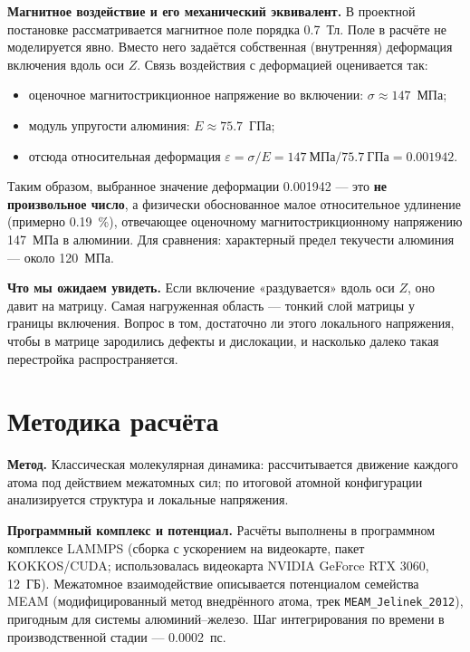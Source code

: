 \documentclass[12pt,a4paper]{extarticle}
\newcommand{\code}[1]{\texttt{#1}}
\begin{document}
\smallskip
\noindent\textbf{Магнитное воздействие и его механический эквивалент.} В проектной постановке рассматривается магнитное поле порядка 0.7~Тл. Поле в расчёте не моделируется явно. Вместо него задаётся собственная (внутренняя) деформация включения вдоль оси $Z$. Связь воздействия с деформацией оценивается так:
\begin{itemize}[leftmargin=1.4em,itemsep=2pt,topsep=2pt]
\item оценочное магнитострикционное напряжение во включении: $\sigma \approx 147$~МПа;
\item модуль упругости алюминия: $E \approx 75.7$~ГПа;
\item отсюда относительная деформация $\varepsilon = \sigma / E = 147~\text{МПа} / 75.7~\text{ГПа} = \mathbf{0.001942}$.
\end{itemize}
Таким образом, выбранное значение деформации 0.001942 — это \textbf{не произвольное число}, а физически обоснованное малое относительное удлинение (примерно 0.19~\%), отвечающее оценочному магнитострикционному напряжению 147~МПа в алюминии. Для сравнения: характерный предел текучести алюминия — около 120~МПа.

\smallskip
\noindent\textbf{Что мы ожидаем увидеть.} Если включение «раздувается» вдоль оси $Z$, оно давит на матрицу. Самая нагруженная область — тонкий слой матрицы у границы включения. Вопрос в том, достаточно ли этого локального напряжения, чтобы в матрице зародились дефекты и дислокации, и насколько далеко такая перестройка распространяется.

\section{Методика расчёта}
\noindent\textbf{Метод.} Классическая молекулярная динамика: рассчитывается движение каждого атома под действием межатомных сил; по итоговой атомной конфигурации анализируется структура и локальные напряжения.

\smallskip
\noindent\textbf{Программный комплекс и потенциал.} Расчёты выполнены в программном комплексе LAMMPS (сборка с ускорением на видеокарте, пакет KOKKOS/CUDA; использовалась видеокарта NVIDIA GeForce RTX 3060, 12~ГБ). Межатомное взаимодействие описывается потенциалом семейства MEAM (модифицированный метод внедрённого атома, трек \code{MEAM\_Jelinek\_2012}), пригодным для системы алюминий--железо. Шаг интегрирования по времени в производственной стадии — 0.0002~пс.
\end{document}
